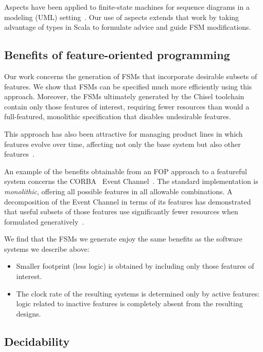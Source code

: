 \documentclass[sigplan,anonymous,review]{acmart}
\begin{document}
Aspects have been applied to finite-state machines for sequence diagrams in a modeling (UML) setting~\cite{aspectsUML}.  Our use of aspects extends that work by taking advantage of types in Scala to formulate advice and guide FSM modifications. 

\subsection{Benefits of feature-oriented programming}\label{sec:benefop}

Our work concerns the generation of FSMs that incorporate desirable subsets of features.  We show that FSMs can be specified much more efficiently using this approach.  Moreover, the FSMs ultimately generated by the Chisel toolchain contain only those features of interest, requiring fewer resources than would a full-featured, monolithic specification that disables undesirable features.

This approach has also been attractive for managing product lines in which features evolve over time, affecting not only the base system but also other features~\cite{10.1145/2897695.2897701}. 

An example of the benefits obtainable from an FOP approach to a featureful system concerns the CORBA~\cite{CORBA:00} Event Channel~\cite{CORBAService:02a}. The standard implementation is \emph{monolithic}, offering all possible features in all allowable combinations.  A decomposition of the Event Channel in terms of its features has demonstrated that useful subsets of those features use significantly fewer resources when formulated generatively~\cite{Pratap:04}.   

We find that the FSMs we generate enjoy the same benefits as the software systems we describe above:
\begin{itemize}
    \item Smaller footprint (less logic) is obtained by including only those features of interest.
    \item The clock rate of the resulting systems is determined only by active features:  logic related to inactive features is completely absent from the resulting designs.
\end{itemize}

  
\subsection{Decidability}\label{sec:decide}
\end{document}
